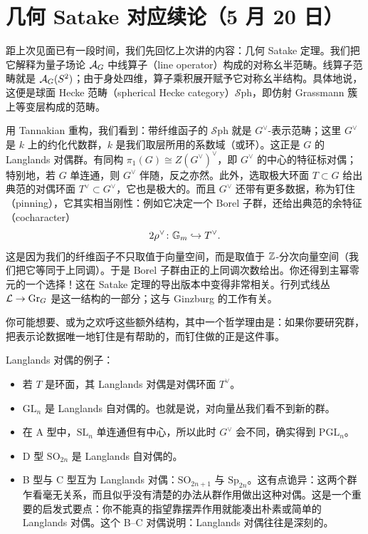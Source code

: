 \section[几何 Satake 对应续论]{几何 Satake 对应续论（5 月 20 日）}


距上次见面已有一段时间，我们先回忆上次讲的内容：几何 Satake 定理。我们把它解释为量子场论 $\mathcal{A}_G$ 中线算子（line operator）构成的对称幺半范畴。线算子范畴就是 $\mathcal{A}_G(S^2)$；由于身处四维，算子乘积展开赋予它对称幺半结构。具体地说，这便是球面 Hecke 范畴（spherical Hecke category）$\mathcal{S}\mathrm{ph}$，即仿射 Grassmann 簇上等变层构成的范畴。

用 Tannakian 重构，我们看到：带纤维函子的 $\mathcal{S}\mathrm{ph}$ 就是 $G^\vee$-表示范畴；这里 $G^\vee$ 是 $k$ 上的约化代数群，$k$ 是我们取层所用的系数域（或环）。这正是 $G$ 的 Langlands 对偶群。有同构 $\pi_1(G)\cong Z(G^\vee)^\vee$，即 $G^\vee$ 的中心的特征标对偶；特别地，若 $G$ 单连通，则 $G^\vee$ 伴随，反之亦然。此外，选取极大环面 $T\subset G$ 给出典范的对偶环面 $T^\vee\subset G^\vee$，它也是极大的。而且 $G^\vee$ 还带有更多数据，称为钉住（pinning），它其实相当刚性：例如它决定一个 Borel 子群，还给出典范的余特征（cocharacter）
\[
2\rho^\vee\colon \mathbb{G}_m\hookrightarrow T^\vee.
\]
这是因为我们的纤维函子不只取值于向量空间，而是取值于 $\mathbb{Z}$-分次向量空间（我们把它等同于上同调）。于是 Borel 子群由正的上同调次数给出。你还得到主幂零元的一个选择！这在 Satake 定理的导出版本中变得非常相关。行列式线丛 $\mathcal{L}\to\mathrm{Gr}_G$ 是这一结构的一部分；这与 Ginzburg 的工作有关。

你可能想要、或为之欢呼这些额外结构，其中一个哲学理由是：如果你要研究群，把表示论数据唯一地钉住是有帮助的，而钉住做的正是这件事。

Langlands 对偶的例子：

\begin{itemize}
\item 若 $T$ 是环面，其 Langlands 对偶是对偶环面 $T^\vee$。
\item $\mathrm{GL}_n$ 是 Langlands 自对偶的。也就是说，对向量丛我们看不到新的群。
\item 在 A 型中，$\mathrm{SL}_n$ 单连通但有中心，所以此时 $G^\vee$ 会不同，确实得到 $\mathrm{PGL}_n$。
\item D 型 $\mathrm{SO}_{2n}$ 是 Langlands 自对偶的。
\item B 型与 C 型互为 Langlands 对偶：$\mathrm{SO}_{2n+1}$ 与 $\mathrm{Sp}_{2n}$。这有点诡异：这两个群乍看毫无关系，而且似乎没有清楚的办法从群作用做出这种对偶。这是一个重要的启发式要点：你不能真的指望靠摆弄作用就能凑出朴素或简单的 Langlands 对偶。这个 B–C 对偶说明：Langlands 对偶往往是深刻的。
\end{itemize}


